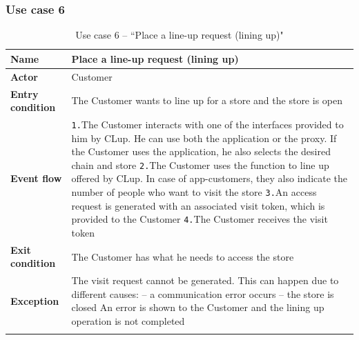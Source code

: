 \documentclass[a4paper,oneside,11pt]{book}   %
\begin{document}
    \subsubsection{Use case 6}
    \begin{longtable}[c] { |>{\bfseries{}}C{0.25\textwidth}|H{0.55\textwidth}| }
        \hline
        Name            & Place a line-up request (lining up) \\ \hline
        Actor           & Customer \\ \hline
        Entry condition & The Customer wants to line up for a store and the store is open \\ \hline
        Event flow      & 
        \texttt{1.}The Customer interacts with one of the interfaces provided to him by CLup. He can use both the application or the proxy. If the Customer uses the application, he also selects the desired chain and store \newline
        \texttt{2.}The Customer uses the function to line up offered by CLup. In case of app-customers, they also indicate the number of people who want to visit the store \newline
        \texttt{3.}An access request is generated with an associated visit token, which is provided to the Customer \newline 
        \texttt{4.}The Customer receives the visit token \\ \hline
        Exit condition  & The Customer has what he needs to access the store \\ \hline
        Exception       & The visit request cannot be generated. This can happen due to different causes: \newline
        -- a communication error occurs \newline
        -- the store is closed \newline
        An error is shown to the Customer and the lining up operation is not completed \\
        \hline
    \caption{Use case 6 -- ``Place a line-up request (lining up)"}
    \label{table:use_case_06}
    \end{longtable}
    \newpage
\end{document}
